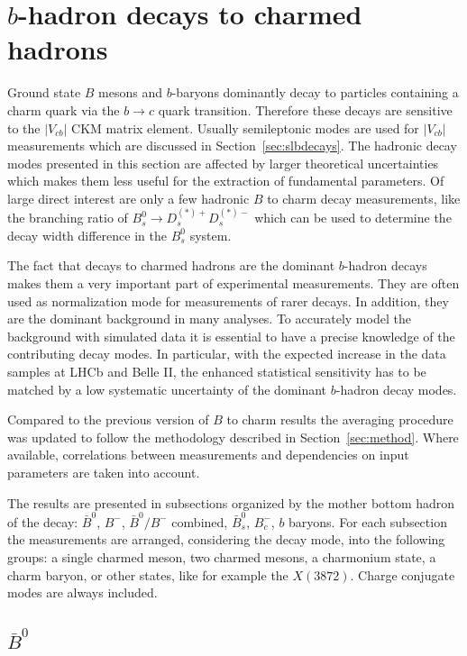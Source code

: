\section{$b$-hadron decays to charmed hadrons}
\label{sec:b2c}
Ground state $B$ mesons and $b$-baryons dominantly decay to particles containing a charm quark via the $b \rightarrow c$ quark transition.
Therefore these decays are sensitive to the $|V_{cb}|$ CKM matrix element.
Usually semileptonic modes are used for $|V_{cb}|$ measurements which are discussed in Section~\ref{sec:slbdecays}.
The hadronic decay modes presented in this section are affected by larger theoretical uncertainties which makes them less useful for the extraction of fundamental parameters.
Of large direct interest are only a few hadronic $B$ to charm decay measurements, like the branching ratio of $B_s^0 \rightarrow D_s^{(*)+} D_s^{(*)-}$ which can be used to determine the decay width difference in the $B_s^0$ system.

The fact that decays to charmed hadrons are the dominant $b$-hadron decays makes them a very important part of experimental measurements.
They are often used as normalization mode for measurements of rarer decays.
In addition, they are the dominant background in many analyses.
To accurately model the background with simulated data it is essential to have a precise knowledge of the contributing decay modes.
In particular, with the expected increase in the data samples at LHCb and Belle II, the enhanced statistical sensitivity has to be matched by a low systematic uncertainty of the dominant $b$-hadron decay modes.

Compared to the previous version of $B$ to charm results the averaging procedure was updated to follow the methodology described in Section~\ref{sec:method}.
Where available, correlations between measurements and dependencies on input parameters are taken into account.

The results are presented in subsections organized by the mother bottom hadron of the decay: $\bar{B}^0$, $B^-$, $\bar{B}^0/B^-$ combined, $\bar{B}_s^0$, $B_c^-$, $b$ baryons.
For each subsection the measurements are arranged, considering the decay mode, into the following groups: a single charmed meson, two charmed mesons, a charmonium state, a charm baryon, or other states, like for example the $X(3872)$.
Charge conjugate modes are always included.

\subsection{$\bar{B}^0$}

